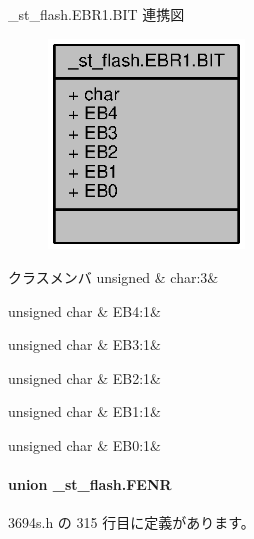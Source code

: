 \+\_\+st\+\_\+flash.\+E\+B\+R1.\+B\+I\+T 連携図
\nopagebreak
\begin{figure}[H]
\begin{center}
\leavevmode
\includegraphics[width=148pt]{d6/d4d/struct__st__flash_8EBR1_8BIT__coll__graph}
\end{center}
\end{figure}
\begin{DoxyFields}{クラスメンバ}
unsigned\label{3694s_8h_aa87deb01c5f539e6bda34829c8ef2368}
&
char\+:3&
\\
\hline

unsigned char\label{3694s_8h_a892b947a43a336979dc60d6e959fbcc2}
&
E\+B4\+:1&
\\
\hline

unsigned char\label{3694s_8h_ab609108005b5fce44a642b0a5f158b88}
&
E\+B3\+:1&
\\
\hline

unsigned char\label{3694s_8h_a499f6e2069a0657d1c72c1e382d954e4}
&
E\+B2\+:1&
\\
\hline

unsigned char\label{3694s_8h_af0b303b94865daaba2226c8dc0c07353}
&
E\+B1\+:1&
\\
\hline

unsigned char\label{3694s_8h_a394b9017c754b8909e90f4eaa8095c62}
&
E\+B0\+:1&
\\
\hline

\end{DoxyFields}
\label{union__st__flash_8FENR}
\paragraph{union \+\_\+st\+\_\+flash.\+F\+E\+N\+R}


 3694s.\+h の 315 行目に定義があります。



